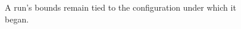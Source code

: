 \begin{figure}[H]
\centering
{}
\caption{A run's bounds remain tied to the configuration under which it began.}\label{fig:teach-M08-02}
\end{figure}
